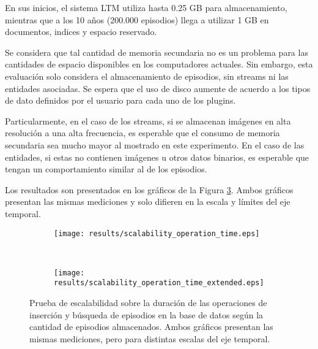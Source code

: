 En sus inicios, el sistema LTM utiliza hasta 0.25 GB para almacenamiento, mientras que a los 10 años (200.000 episodios) llega a utilizar 1 GB en documentos, indices y espacio reservado. 

Se considera que tal cantidad de memoria secundaria no es un problema para las cantidades de espacio disponibles en los computadores actuales. Sin embargo, esta evaluación solo considera el almacenamiento de episodios, sin streams ni las entidades asociadas. Se espera que el uso de disco aumente de acuerdo a los tipos de dato definidos por el usuario para cada uno de los plugins. 

Particularmente, en el caso de los streams, si se almacenan imágenes en alta resolución a una alta frecuencia, es esperable que el consumo de memoria secundaria sea mucho mayor al mostrado en este experimento. En el caso de las entidades, si estas no contienen imágenes u otros datos binarios, es esperable que tengan un comportamiento similar al de los episodios.



 Los resultados son presentados en los gráficos de la Figura \ref{result:scalability_time_usage}. Ambos gráficos presentan las mismas mediciones y solo difieren en la escala y límites del eje temporal.

\begin{figure}[!ht]
	\centering
	\begin{subfigure}[b]{\graphwidth\textwidth}
		\texttt{[image: results/scalability\_operation\_time.eps]}
		\caption{}
		\label{result:scalability_time_usage_normal}
	\end{subfigure}
	~
	\begin{subfigure}[b]{\graphwidth\textwidth}
		\texttt{[image: results/scalability\_operation\_time\_extended.eps]}
		\caption{}
		\label{result:scalability_time_usage_extended}
	\end{subfigure}
	\caption[Escalabilidad: Duración de consultas según cantidad de episodios.]
	{\small Prueba de escalabilidad sobre la duración de las operaciones de inserción y búsqueda de episodios en la base de datos según la cantidad de episodios almacenados. Ambos gráficos presentan las mismas mediciones, pero para distintas escalas del eje temporal.}
	\label{result:scalability_time_usage}
\end{figure}

